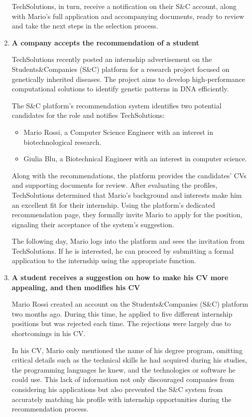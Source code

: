 \begin{enumerate}
    TechSolutions, in turn, receive a notification on their S\&C account, along with Mario’s full application and accompanying documents, ready to review and take the next steps in the selection process.

    \item \textbf{A company accepts the recommendation of a student}
    
    TechSolutions recently posted an internship advertisement on the Students\&Companies (S\&C) platform for a research project focused on genetically inherited diseases. The project aims to develop high-performance computational solutions to identify genetic patterns in DNA efficiently.

    The S\&C platform’s recommendation system identifies two potential candidates for the role and notifies TechSolutions:

    \begin{itemize}
        \item  Mario Rossi, a Computer Science Engineer with an interest in biotechnological research.
        \item Giulia Blu, a Biotechnical Engineer with an interest in computer science.
    \end{itemize}
    
    Along with the recommendations, the platform provides the candidates’ CVs and supporting documents for review. After evaluating the profiles, TechSolutions determined that Mario’s background and interests make him an excellent fit for their internship. Using the platform’s dedicated recommendation page, they formally invite Mario to apply for the position, signaling their acceptance of the system’s suggestion.

    The following day, Mario logs into the platform and sees the invitation from TechSolutions. If he is interested, he can proceed by submitting a formal application to the internship using the appropriate function.

    \item \textbf{A student receives a suggestion on how to make his CV more appealing, and then modifies his CV}

    Mario Rossi created an account on the Students\&Companies (S\&C) platform two months ago. During this time, he applied to five different internship positions but was rejected each time. The rejections were largely due to shortcomings in his CV.

    In his CV, Mario only mentioned the name of his degree program, omitting critical details such as the technical skills he had acquired during his studies, the programming languages he knew, and the technologies or software he could use. This lack of information not only discouraged companies from considering his applications but also prevented the S\&C system from accurately matching his profile with internship opportunities during the recommendation process.


\end{enumerate}
